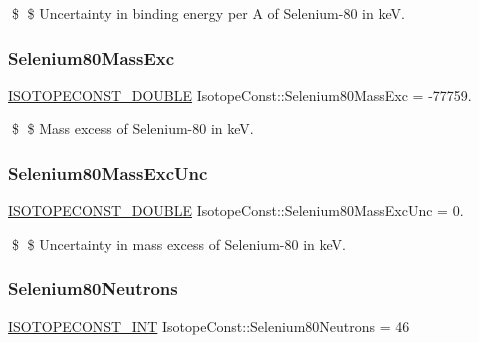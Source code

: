 \$ \$ Uncertainty in binding energy per A of Selenium-\/80 in keV. \mbox{\label{group___isotope_const-_selenium-_se80_ga5c0074c432050cb25ebb6b63ea4387bc}} 
\subsubsection{\texorpdfstring{Selenium80\+Mass\+Exc}{Selenium80MassExc}}
{\footnotesize\ttfamily \mbox{\hyperlink{group___isotope_const-_macros_ga8f45a7272ce02c0b4c65c44636ed719a}{I\+S\+O\+T\+O\+P\+E\+C\+O\+N\+S\+T\+\_\+\+D\+O\+U\+B\+LE}} Isotope\+Const\+::\+Selenium80\+Mass\+Exc = -\/77759.}

\$ \$ Mass excess of Selenium-\/80 in keV. \mbox{\label{group___isotope_const-_selenium-_se80_gabfff2dc159202cd97b45bd3134c0ee7b}} 
\subsubsection{\texorpdfstring{Selenium80\+Mass\+Exc\+Unc}{Selenium80MassExcUnc}}
{\footnotesize\ttfamily \mbox{\hyperlink{group___isotope_const-_macros_ga8f45a7272ce02c0b4c65c44636ed719a}{I\+S\+O\+T\+O\+P\+E\+C\+O\+N\+S\+T\+\_\+\+D\+O\+U\+B\+LE}} Isotope\+Const\+::\+Selenium80\+Mass\+Exc\+Unc = 0.}

\$ \$ Uncertainty in mass excess of Selenium-\/80 in keV. \mbox{\label{group___isotope_const-_selenium-_se80_gabd69e86b182fc3622dfee20aa5215576}} 
\subsubsection{\texorpdfstring{Selenium80\+Neutrons}{Selenium80Neutrons}}
{\footnotesize\ttfamily \mbox{\hyperlink{group___isotope_const-_macros_ga5f18360b3e99483a35c32d789e62621c}{I\+S\+O\+T\+O\+P\+E\+C\+O\+N\+S\+T\+\_\+\+I\+NT}} Isotope\+Const\+::\+Selenium80\+Neutrons = 46}

